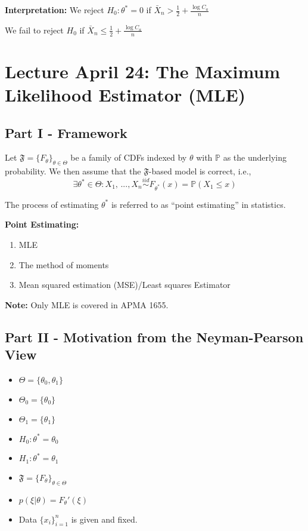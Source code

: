 \documentclass[12pt]{article}
\renewcommand{\P}{\mathbb{P}}
\begin{document}
\textbf{Interpretation:}
We reject $H_0 : \theta^* = 0$ if $\bar{X}_n > \frac{1}{2} + \frac{\log C_a}{n}$

We fail to reject $H_0$ if $\bar{X}_n \leq \frac{1}{2} + \frac{\log C_a}{n}$


\section*{Lecture April 24: The Maximum Likelihood Estimator (MLE)}
\subsection*{Part I - Framework}
Let $\mathfrak{F} = \{F_\theta\}_{\theta \in \Theta}$ be a family of CDFs indexed by $\theta$ with $\P$ as the underlying probability. We then assume that the $\mathfrak{F}$-based model is correct, i.e.,
\[\exists \theta^* \in \Theta: X_1, \, ..., X_n \overset{iid}{\sim} F_{\theta^*}(x) = \P(X_1 \leq x)\]

The process of estimating $\theta^*$ is referred to as ``point estimating'' in statistics. 

\textbf{Point Estimating:}
\begin{enumerate}
    \item MLE
    \item The method of moments
    \item Mean squared estimation (MSE)/Least squares Estimator
\end{enumerate}

\textbf{Note:} Only MLE is covered in APMA 1655. 

\subsection*{Part II - Motivation from the Neyman-Pearson View}
\begin{itemize}
    \item $\Theta = \{\theta_0, \theta_1\}$
    \item $\Theta_0 = \{\theta_0\}$
    \item $\Theta_1 = \{\theta_1\}$
    \item $H_0: \theta^* = \theta_0$
    \item $H_1: \theta^* = \theta_1$
    \item $\mathfrak{F} = \{F_\theta\}_{\theta \in \Theta}$
    \item $p(\xi | \theta) = F_\theta'(\xi)$
    \item Data $\{x_i\}_{i=1}^n$ is given and fixed.
\end{itemize}
\end{document}
